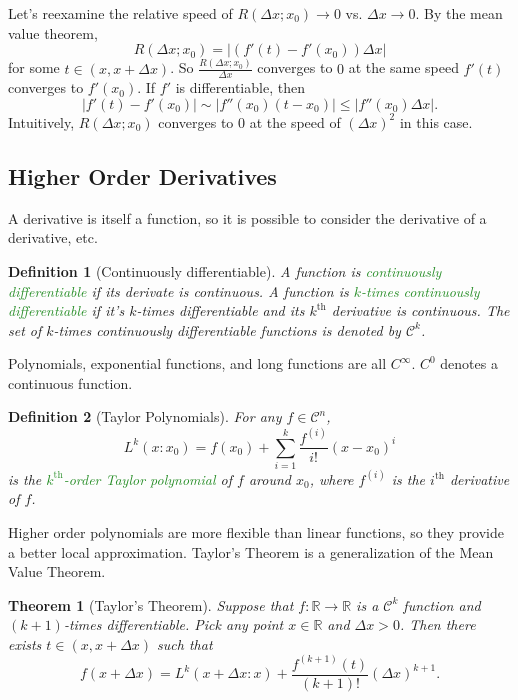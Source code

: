 \documentclass[11pt]{article}
\newtheorem*{definition}{Definition}
\newtheorem*{theorem}{Theorem}
\newcommand{\gr}{\textcolor{ForestGreen}}
\newcommand{\R}{\mathbb{R}}
\begin{document}
Let's reexamine the relative speed of \(R(\Delta x; x_0) \to 0\) vs. \(\Delta x \to 0\). By the mean value theorem,
\[
R(\Delta x; x_0) = |(f'(t) - f'(x_0))\Delta x|
\]
for some \(t \in (x, x + \Delta x)\). So \(\frac{R(\Delta x; x_0)}{\Delta x}\) converges to \(0\) at the same speed \(f'(t)\) converges to \(f'(x_0)\). If \(f'\) is differentiable, then
\begin{equation*}
|f'(t) - f'(x_0)| \sim |f''(x_0)(t - x_0)| \le |f''(x_0)\Delta x|.
\end{equation*}
Intuitively, \(R(\Delta x; x_0)\) converges to \(0\) at the speed of \((\Delta x)^2\) in this case.
\subsection{Higher Order Derivatives}
\label{sec:orga672a35}
A derivative is itself a function, so it is possible to consider the derivative of a derivative, etc.

\begin{definition}[Continuously differentiable]
A function is \gr{continuously differentiable} if its derivate is continuous. A function is \gr{$k$-times continuously differentiable} if it's $k$-times differentiable and its $k^{\text{th}}$ derivative is continuous. The set of $k$-times continuously differentiable functions is denoted by $\mathcal{C}^k$.
\end{definition}

Polynomials, exponential functions, and long functions are all \(C^\infty\). \(C^0\) denotes a continuous function.

\begin{definition}[Taylor Polynomials]
For any $f \in \mathcal{C}^n$,
\[
L^k(x: x_0) = f(x_0) + \sum^k_{i = 1} \frac{f^{(i)}}{i!}(x - x_0)^i
\] 
is the \gr{$k^{\text{th}}$-order Taylor polynomial} of $f$ around $x_0$, where $f^{(i)}$ is the $i^{\text{th}}$ derivative of $f$.
\end{definition}
Higher order polynomials are more flexible than linear functions, so they provide a better local approximation. Taylor's Theorem is a generalization of the Mean Value Theorem.
\begin{theorem}[Taylor's Theorem]
Suppose that $f: \R \to \R$ is a $\mathcal{C}^k$ function and $(k + 1)$-times differentiable. Pick any point $x \in \R$ and $\Delta x > 0$. Then there exists $t \in (x, x + \Delta x)$ such that 
\[
f(x + \Delta x) = L^k(x + \Delta x: x) + \frac{f^{(k + 1)}(t)}{(k + 1)!}(\Delta x)^{k + 1}.
\]
\end{theorem}
\end{document}
